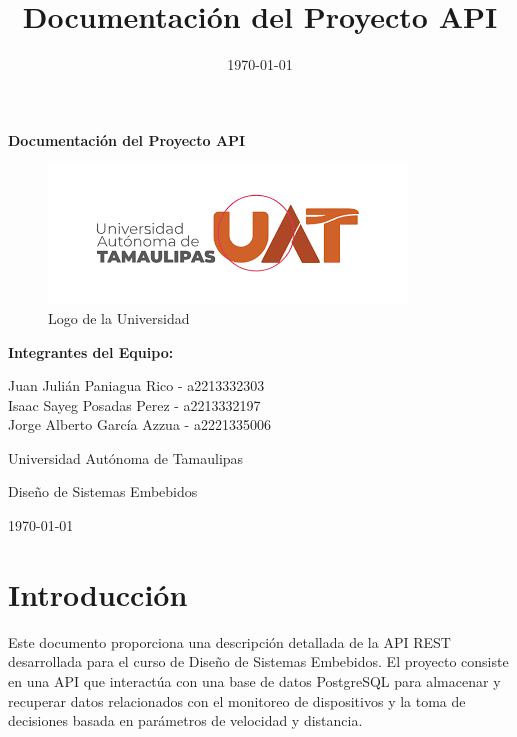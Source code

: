 \documentclass{article}
\title{Documentación del Proyecto API}
\author{}
\date{\today}
\begin{document}
\begin{titlepage}
    \centering
    \vspace*{1cm}
    
    {\huge\bfseries Documentación del Proyecto API\par}
    \vspace{2cm}
    
    \begin{figure}[h]
        \centering\includegraphics{logo_uat}
        \caption*{Logo de la Universidad}
    \end{figure}
    
    \vspace{2cm}
    
    {\Large\bfseries Integrantes del Equipo:\par}
    \vspace{0.5cm}
    



        Juan Julián Paniagua Rico - a2213332303 \\
        Isaac Sayeg Posadas Perez - a2213332197  \\
        Jorge Alberto García Azzua - a2221335006 \\


    \vfill
    
    {\large Universidad Autónoma de Tamaulipas\par}
    {\large Diseño de Sistemas Embebidos\par}
    {\large \today\par}
\end{titlepage}

\tableofcontents
\newpage

\section{Introducción}
Este documento proporciona una descripción detallada de la API REST desarrollada para el curso de Diseño de Sistemas Embebidos. El proyecto consiste en una API que interactúa con una base de datos PostgreSQL para almacenar y recuperar datos relacionados con el monitoreo de dispositivos y la toma de decisiones basada en parámetros de velocidad y distancia.
\end{document}
